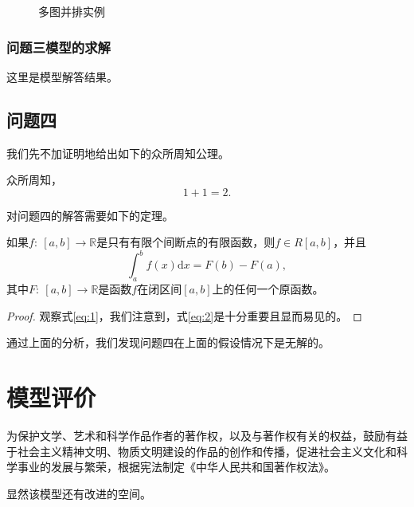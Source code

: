 \documentclass{my_cumcmthesis}
\begin{document}
\begin{figure}[htbp]
\begin{minipage}[c]{0.48\textwidth}
            \label{fig:duet}
        \end{minipage}
        \caption{多图并排实例}
        \label{fig:eg3}
    \end{figure}
\subsubsection{问题三模型的求解}
    这里是模型解答结果。
\subsection{问题四}
    我们先不加证明地给出如下的众所周知公理。
    \begin{lemma}[众所周知公理]
        众所周知，
        \begin{equation}
            1 + 1 = 2.
            \label{eq:1}
        \end{equation}
        \label{lma:wellknown}
    \end{lemma}
    对问题四的解答需要如下的定理。
    \begin{theorem}
        如果$f:\ [a,b] \rightarrow \mathbb{R}$是只有有限个间断点的有限函数，则$f\in R[a,b]$，并且
    \begin{equation}
        \int_{a}^{b}f(x)\mathrm{d}x = F(b) - F(a),
        \label{eq:2}
    \end{equation}
    其中$F:\ [a,b] \rightarrow \mathbb{R}$是函数$f$在闭区间$[a,b]$上的任何一个原函数。
    \label{thm:NL}
    \end{theorem}
    \begin{proof}
        观察式\eqref{eq:1}，我们注意到，式\eqref{eq:2}是十分重要且显而易见的。
    \end{proof}
    通过上面的分析，我们发现问题四在上面的假设情况下是无解的。

\section{模型评价}
    为保护文学、艺术和科学作品作者的著作权，以及与著作权有关的权益，鼓励有益于社会主义精神文明、物质文明建设的作品的创作和传播，促进社会主义文化和科学事业的发展与繁荣，根据宪法制定《中华人民共和国著作权法》。
    
    显然该模型还有改进的空间。
\newpage
\end{document}
